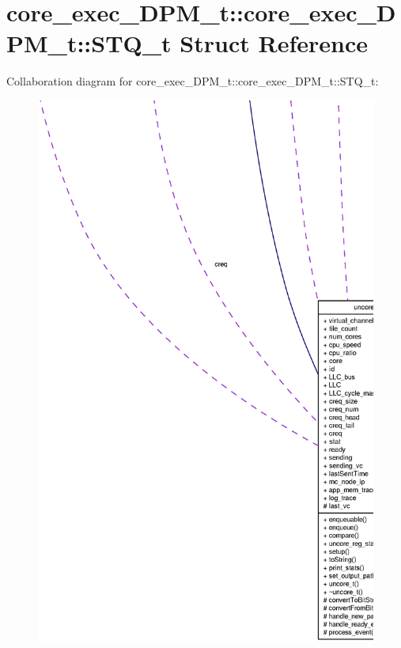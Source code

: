 \section{core\_\-exec\_\-DPM\_\-t::core\_\-exec\_\-DPM\_\-t::STQ\_\-t Struct Reference}
\label{structcore__exec__DPM__t_1_1STQ__t}
Collaboration diagram for core\_\-exec\_\-DPM\_\-t::core\_\-exec\_\-DPM\_\-t::STQ\_\-t:\nopagebreak
\begin{figure}[H]
\begin{center}
\leavevmode
\includegraphics[width=400pt]{structcore__exec__DPM__t_1_1STQ__t__coll__graph}
\end{center}
\end{figure}
